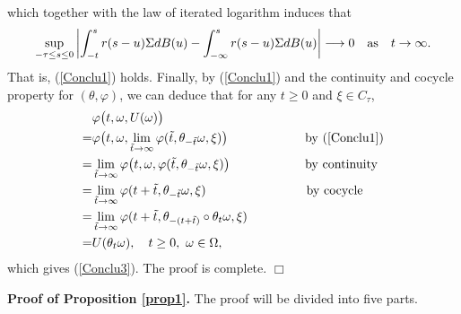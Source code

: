 \documentclass[preprint,12pt]{elsarticle}
\begin{document}
which together with the law of iterated logarithm induces that
\[\sup_{-\tau\leq s\leq0}\left|\int_{-t}^s r(s-u)\Sigma dB(u)-\int_{-\infty}^{s}r(s-u)\Sigma dB(u)\right|\longrightarrow0\quad {\rm as}\quad t\rightarrow\infty.\]
That is, (\ref{Conclu1}) holds. Finally, by (\ref{Conclu1}) and the continuity and cocycle property for $(\theta,\varphi)$, we can deduce that for any $t\geq0$ and $\xi\in C_\tau$,
\begin{align}\label{eq10-2}
&\varphi\bigl(t,\omega,U(\omega)\bigr)\nonumber\\
=&\varphi\bigl(t,\omega,\lim_{\tilde{t}\rightarrow\infty}\varphi(\tilde{t},\theta_{-\tilde{t}}\omega,\xi)\bigr)\qquad\qquad\qquad\,{\rm by\ (\ref{Conclu1})}\nonumber\\
=&\lim_{\tilde{t}\rightarrow\infty}\varphi\bigl(t,\omega,\varphi(\tilde{t},\theta_{-\tilde{t}}\omega,\xi)\bigr)\qquad\qquad\qquad{\rm by\ continuity}\nonumber\\
=&\lim_{\tilde{t}\rightarrow\infty}\varphi(t+\tilde{t},\theta_{-\tilde{t}}\omega,\xi)\qquad\qquad\qquad\qquad{\rm by\ cocycle}\nonumber\\
=&\lim_{\tilde{t}\rightarrow\infty}\varphi(t+\tilde{t},\theta_{-(t+\tilde{t})}\circ\theta_t\omega,\xi)\nonumber\\
=&U(\theta_t\omega),\quad t\geq0,\ \omega\in\Omega,
\end{align}
which gives (\ref{Conclu3}). The proof is complete.
\quad\quad$\Box$

\noindent
{\bf Proof of Proposition \ref{prop1}.} The proof will be divided into five parts.
\end{document}
